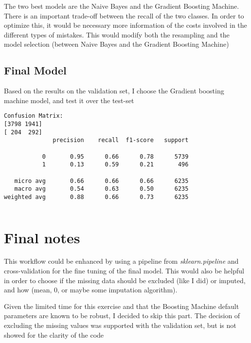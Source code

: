 \documentclass[11pt]{article}
\begin{document}
The two best models are the Naive Bayes and the Gradient Boosting Machine. There is an important trade-off between the recall of the two classes.
In order to optimize this, it would be necessary more information of the costs involved in the different types of mistakes. This would modify both the resampling and the model selection (between Naive Bayes and the Gradient Boosting Machine)

    \hypertarget{final-model}{%
\subsection{Final Model}\label{final-model}}

Based on the results on the validation set, I choose the Gradient boosting machine model, and test it over the test-set


    \begin{Verbatim}[commandchars=\\\{\}]
Confusion Matrix: 
[3798 1941]
[ 204  292]
              precision    recall  f1-score   support

           0       0.95      0.66      0.78      5739
           1       0.13      0.59      0.21       496

   micro avg       0.66      0.66      0.66      6235
   macro avg       0.54      0.63      0.50      6235
weighted avg       0.88      0.66      0.73      6235


    \end{Verbatim}

    \hypertarget{final-notes}{%
\section{Final notes}\label{final-notes}}

This workflow could be enhanced by using a pipeline from \emph{sklearn.pipeline} and cross-validation for the fine tuning of the final model. This would also be helpful in order to choose if the missing data should be excluded (like I did) or imputed, and how (mean, 0, or maybe some imputation algorithm).


Given the limited time for this exercise and that the Boosting Machine default parameters are known to be robust, I decided to skip this part. The decision of excluding the missing values was supported with the validation set, but is not showed for the clarity of the code


    
    
    
    
\end{document}
